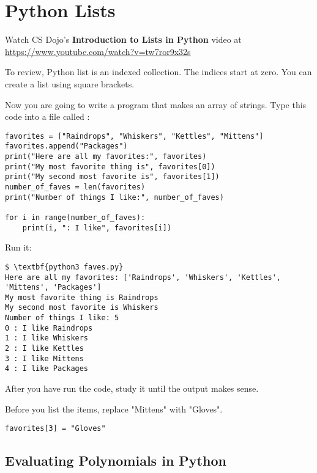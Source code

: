 \chapter{Python Lists}

Watch CS Dojo's \textbf{Introduction to Lists in Python} video at \url{https://www.youtube.com/watch?v=tw7ror9x32s}

To review, Python list is an indexed collection. The indices start at
zero. You can create a list using square brackets.

Now you are going to write a program that makes an array of
strings. Type this code into a file called :

\begin{Verbatim}
favorites = ["Raindrops", "Whiskers", "Kettles", "Mittens"]
favorites.append("Packages")
print("Here are all my favorites:", favorites)
print("My most favorite thing is", favorites[0])
print("My second most favorite is", favorites[1])
number_of_faves = len(favorites)
print("Number of things I like:", number_of_faves)

for i in range(number_of_faves):
    print(i, ": I like", favorites[i])
\end{Verbatim}

Run it:
\begin{Verbatim}[commandchars=\\\{\}]
$ \textbf{python3 faves.py}
Here are all my favorites: ['Raindrops', 'Whiskers', 'Kettles', 'Mittens', 'Packages']
My most favorite thing is Raindrops
My second most favorite is Whiskers
Number of things I like: 5
0 : I like Raindrops
1 : I like Whiskers
2 : I like Kettles
3 : I like Mittens
4 : I like Packages
\end{Verbatim}
After you have run the code, study it until the output makes sense.

\begin{Exercise}[title={Assign into list}, label=assignintolist]
  Before you list the items, replace "Mittens" with "Gloves".
\end{Exercise}
\begin{Answer}[ref=assignintolist]
\begin{Verbatim}
favorites[3] = "Gloves"
\end{Verbatim}
\end{Answer}

\section{Evaluating Polynomials in Python}

